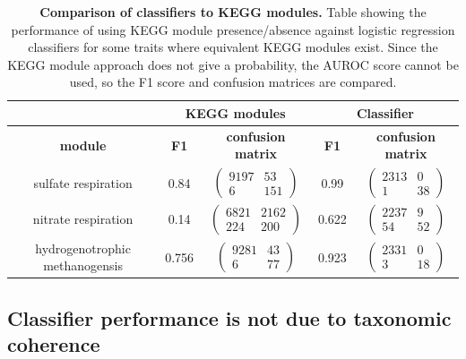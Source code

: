 \documentclass[10pt,letterpaper]{article}
\begin{document}
\begin{table}
\scriptsize
\begin{tabular}{|c|c|c|c|c|}\cline{2-5}%

 \multicolumn{1}{c|}{} &  \multicolumn{2}{|c|}{\bfseries KEGG modules} & \multicolumn{2}{|c|}{\bfseries Classifier} \\ \hline
 \rowcolor{LightGray} \bfseries module & \bfseries F1 & \bfseries confusion matrix & \bfseries F1 & \bfseries confusion matrix \\\hline
sulfate respiration & 0.84 & $\begin{pmatrix}9197 & 53 \\ 6 & 151\end{pmatrix}$ & 0.99 & $\begin{pmatrix}2313 & 0 \\ 1 & 38\end{pmatrix}$\\ \hline
nitrate respiration & 0.14 & $\begin{pmatrix}6821 & 2162\\ 224 & 200\end{pmatrix}$ & 0.622 & $\begin{pmatrix}2237 & 9 \\ 54 & 52\end{pmatrix}$\\ \hline
hydrogenotrophic methanogensis & 0.756 & $\begin{pmatrix}9281 & 43 \\ 6 & 77\end{pmatrix}$ & 0.923 & $\begin{pmatrix} 2331 & 0\\ 3 & 18\end{pmatrix}$\\ \hline
\end{tabular}

\caption{{\bf Comparison of classifiers to KEGG modules.}
Table showing the performance of using KEGG module presence/absence against logistic regression classifiers for some traits where equivalent KEGG modules exist. Since the KEGG module approach does not give a probability, the AUROC score cannot be used, so the F1 score and confusion matrices are compared.}\label{tab2}
\end{table}

\subsection*{Classifier performance is not due to taxonomic coherence}
\end{document}
